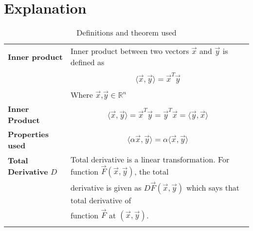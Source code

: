 \documentclass[journal,12pt]{IEEEtran}
\begin{document}
\section{\textbf{Explanation}}
\renewcommand{\thetable}{1}
\begin{longtable}{|l|l|}
\hline
\endhead
\textbf{Inner product}&Inner product between two vectors $\vec{x}$ and $\vec{y}$ is defined as\\&\parbox{13cm}{\begin{align}
    \langle\vec{x},\vec{y}\rangle=\vec{x}^T\vec{y}\label{inp}
\end{align}}\\&Where $\vec{x}$,$\vec{y}\in\mathbb{R}^n$\\
\hline
\textbf{Inner Product}&\parbox{13cm}{\begin{align}
    \langle\vec{x},\vec{y}\rangle=\vec{x}^T\vec{y}=\vec{y}^T\vec{x}=\langle\vec{y},\vec{x}\rangle\label{prop1}
    \end{align}}\\\textbf{Properties used}&\parbox{13cm}{\begin{align}
    \langle\alpha\vec{x},\vec{y}\rangle=\alpha\langle\vec{x},\vec{y}\rangle\label{prop2}
\end{align}}\\
\hline
\textbf{Total Derivative} $D$&Total derivative is a linear transformation. For function $\vec{F}(\vec{x},\vec{y})$, the total\\& derivative is given as $D\vec{F}(\vec{x},\vec{y})$ which says that total derivative of\\&function $\vec{F}$ at $(\vec{x},\vec{y})$.\\
\hline
\caption{Definitions and theorem used}
\label{deftab}
\end{longtable}
\end{document}
